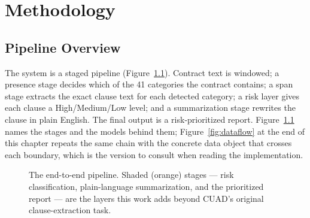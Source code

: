 \chapter{Methodology}

\section{Pipeline Overview}
The system is a staged pipeline (Figure~\ref{fig:pipeline}). Contract text is windowed; a presence stage decides which of the 41 categories the contract contains; a span stage extracts the exact clause text for each detected category; a risk layer gives each clause a High/Medium/Low level; and a summarization stage rewrites the clause in plain English. The final output is a risk-prioritized report. Figure~\ref{fig:pipeline} names the stages and the models behind them; Figure~\ref{fig:dataflow} at the end of this chapter repeats the same chain with the concrete data object that crosses each boundary, which is the version to consult when reading the implementation.

\begin{figure}[ht]
\centering
{}
\caption{The end-to-end pipeline. Shaded (orange) stages --- risk classification, plain-language summarization, and the prioritized report --- are the layers this work adds beyond CUAD's original clause-extraction task.}
\label{fig:pipeline}
\end{figure}


